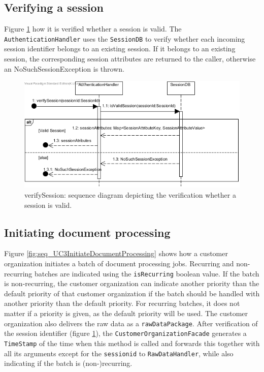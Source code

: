 \documentclass[a4paper,10pt]{article}
\begin{document}
\subsection{Verifying a session}
\label{scenario:VerifySession}
Figure \ref{fig:seq_VerifySession} how it is verified whether a session is valid. The \texttt{AuthenticationHandler} uses the \texttt{SessionDB} to verify whether each incoming session identifier belongs to an existing session. If it belongs to an existing session, the corresponding session attributes are returned to the caller, otherwise an NoSuchSessionException is thrown.
\begin{figure}[!htp]
    \centering
    \includegraphics[width=\textwidth]{Seq_VerifySession.png}
    \caption{verifySession: sequence diagram depicting the verification whether a session is valid.
        }\label{fig:seq_VerifySession}
\end{figure}

\FloatBarrier

\subsection{Initiating document processing}
\label{scenario:InitiateDocProcessing}
Figure \ref{fig:seq_UC3InitiateDocumentProcessing} shows how a customer organization initiates a batch of document processing jobs. Recurring and non-recurring batches are indicated using the \texttt{isRecurring} boolean value. If the batch is non-recurring, the customer organization can indicate another priority than the default priority of that customer organization if the batch should be handled with another priority than the default priority.  For recurring batches, it does not matter if a priority is given, as the default priority will be used. The customer organization also delivers the raw data as a \texttt{rawDataPackage}. After verification of the session identifier (figure \ref{fig:seq_VerifySession}), the \texttt{CustomerOrganizationFacade} generates a \texttt{TimeStamp} of the time when this method is called and forwards this together with all its arguments except for the \texttt{sessionid} to \texttt{RawDataHandler}, while also indicating if the batch is (non-)recurring.\\
\end{document}
